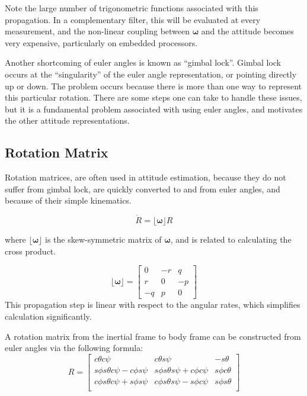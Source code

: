 \documentclass[paper=a4, fontsize=11pt]{scrartcl} %
\numberwithin{equation}{section} %
\numberwithin{figure}{section} %
\numberwithin{table}{section} %
\begin{document}
Note the large number of trigonometric functions associated with this propagation.  In a complementary filter, this will be evaluated at every measurement, and the non-linear coupling between $\bm{\omega}$  and the attitude becomes very expensive, particularly on embedded processors.

Another shortcoming of euler angles is known as ``gimbal lock''.  Gimbal lock occurs at the ``singularity'' of the euler angle representation, or pointing directly up or down.  The problem occurs because there is more than one way to represent this particular rotation.  There are some steps one can take to handle these issues, but it is a fundamental problem associated with using euler angles, and motivates the other attitude representations. 

\subsection{Rotation Matrix}

Rotation matrices, are often used in attitude estimation, because they do not suffer from gimbal lock, are quickly converted to and from euler angles, and because of their simple kinematics.

\begin{equation}
	\dot{R} = \lfloor\bm{\omega}\rfloor R
\end{equation}

where $\lfloor \bm{\omega} \rfloor$ is the skew-symmetric matrix of $\bm{\omega}$, and is related to calculating the cross product. 

\begin{equation}
	\lfloor\bm{\omega}\rfloor = 
	\begin{bmatrix}
		0 & -r & q \\
		r & 0 & -p \\
		-q & p & 0 
	\end{bmatrix} 
\end{equation}
  This propagation step is linear with respect to the angular rates, which simplifies calculation significantly.

A rotation matrix from the inertial frame to body frame can be constructed from euler angles via the following formula:
\newcommand{\ct}{c\theta}
\newcommand{\cp}{c\phi}
\newcommand{\cs}{c\psi}
\newcommand{\st}{s\theta}
\newcommand{\sphi}{s\phi}
\newcommand{\spsi}{s\psi}
\begin{equation}
	    R = \begin{bmatrix}
	    	\ct\cs & \ct\spsi & -\st \\
        \sphi\st\cs-\cp\spsi & \sphi\st\spsi+\cp\cs & \sphi\ct \\
        \cp\st\cs+\sphi\spsi & \cp\st\spsi-\sphi\cs & \sphi\st \\
        \end{bmatrix}
\end{equation}
\end{document}

